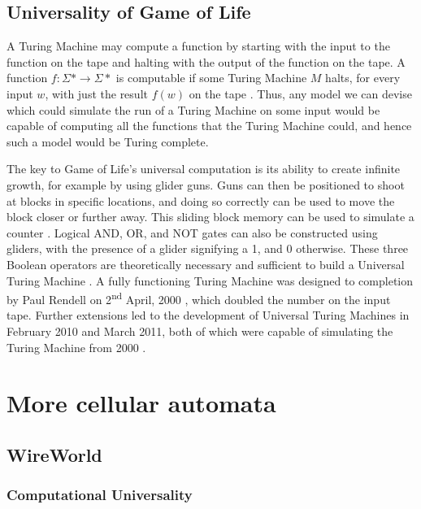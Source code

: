 \documentclass[11pt,a4paper]{article}
\begin{document}
    \subsection{Universality of Game of Life}
    A Turing Machine may compute a function by starting with the input to the
    function on the tape and halting with the output of the function on the
    tape. A function $f : \Sigma \ast \rightarrow \Sigma \ast$ is computable if
    some Turing Machine $M$ halts, for every input $w$, with just the result
    $f(w)$ on the tape \cite{Computable}. Thus, any model we can devise which
    could simulate the run of a Turing Machine on some input would be capable of
    computing all the functions that the Turing Machine could, and hence such a
    model would be Turing complete.

    The key to Game of Life's universal computation is its ability to create
    infinite growth, for example by using glider guns. Guns can then be
    positioned to shoot at blocks in specific locations, and doing so correctly
    can be used to move the block closer or further away. This sliding block
    memory can be used to simulate a counter \cite{Counter}. Logical AND, OR,
    and NOT gates can also be constructed using gliders, with the presence of a
    glider signifying a 1, and 0 otherwise. These three Boolean operators are
    theoretically necessary and sufficient to build a Universal Turing Machine
    \cite{BoolTM}. A fully functioning Turing Machine was designed to completion
    by Paul Rendell on 2\textsuperscript{nd} April, 2000 \cite{golTM}, which
    doubled the number on the input tape. Further extensions led to the
    development of Universal Turing Machines in February 2010 and March 2011,
    both of which were capable of simulating the Turing Machine from 2000
    \cite{golUTM1,golUTM2}.


\section{More cellular automata}
    \subsection{WireWorld}
    \subsubsection{Computational Universality}
\end{document}
